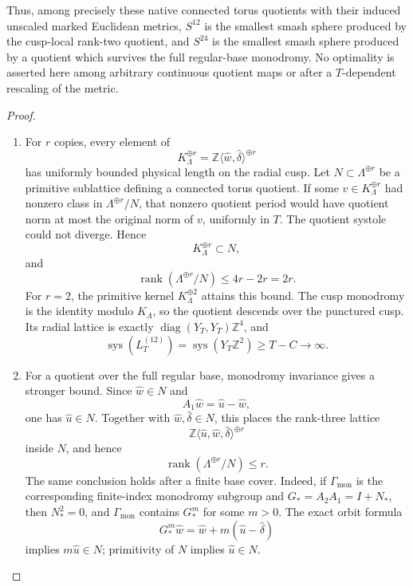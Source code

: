 \begin{theorem}
Thus, among precisely these native connected torus quotients with their
induced unscaled marked Euclidean metrics, \(S^{12}\) is the smallest smash
sphere produced by the cusp-local rank-two quotient, and \(S^{24}\) is the
smallest smash sphere produced by a quotient which survives the full
regular-base monodromy.  No optimality is asserted here among arbitrary
continuous quotient maps or after a \(T\)-dependent rescaling of the metric.
\end{theorem}



\begin{proof}
\begin{enumerate}[label=\arabic*.,leftmargin=*]
\item For \(r\) copies, every element of
\[
 K_\Lambda^{\oplus r}
 =\mathbb Z\langle\widehat w,\widehat\delta\rangle^{\oplus r}
\]
has uniformly bounded physical length on the radial cusp.  Let
\(N\subset\Lambda^{\oplus r}\) be a primitive sublattice defining a
connected torus quotient.  If some \(v\in K_\Lambda^{\oplus r}\) had
nonzero class in \(\Lambda^{\oplus r}/N\), that nonzero quotient period
would have quotient norm at most the original norm of \(v\), uniformly in
\(T\).  The quotient systole could not diverge.  Hence
\[
 K_\Lambda^{\oplus r}\subset N,
\]
and
\[
 \operatorname{rank}(\Lambda^{\oplus r}/N)
 \leq 4r-2r=2r.
\]
For \(r=2\), the primitive kernel \(K_\Lambda^{\oplus2}\) attains this
bound.  The cusp monodromy is the identity modulo \(K_\Lambda\), so the
quotient descends over the punctured cusp.  Its radial lattice is exactly
\(\operatorname{diag}(Y_T,Y_T)\mathbb Z^4\), and
\[
 \operatorname{sys}(L_T^{(12)})
 =\operatorname{sys}(Y_T\mathbb Z^2)\geq T-C\longrightarrow\infty.
\]

\item For a quotient over the full regular base, monodromy invariance gives a
stronger bound.  Since \(\widehat w\in N\) and
\[
 A_1\widehat w=\widehat u-\widehat w,
\]
one has \(\widehat u\in N\).  Together with
\(\widehat w,\widehat\delta\in N\), this places the rank-three lattice
\[
 \mathbb Z\langle\widehat u,\widehat w,
 \widehat\delta\rangle^{\oplus r}
\]
inside \(N\), and hence
\[
 \operatorname{rank}(\Lambda^{\oplus r}/N)\leq r.
\]
The same conclusion holds after a finite base cover.  Indeed, if
\(\Gamma_{\mathrm{mon}}\) is the corresponding finite-index monodromy
subgroup and \(G_*=A_2A_1=I+N_*\), then \(N_*^2=0\), and
\(\Gamma_{\mathrm{mon}}\) contains \(G_*^m\) for
some \(m>0\).  The exact orbit formula
\[
 G_*^m\widehat w
 =\widehat w+m(\widehat u-\widehat\delta)
\]
implies \(m\widehat u\in N\); primitivity of \(N\) implies
\(\widehat u\in N\).


\end{enumerate}
\end{proof}
